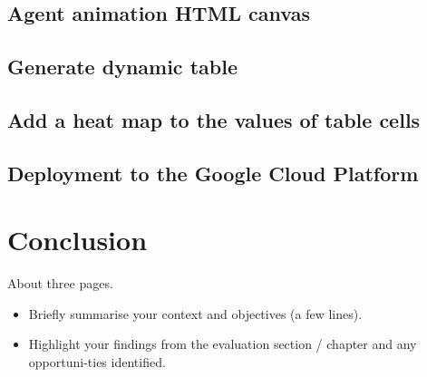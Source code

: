 \section{Agent animation HTML canvas}

\section{Generate dynamic table}

\section{Add a heat map to the values of table cells}

\section{Deployment to the Google Cloud Platform}
	



\chapter{Conclusion}
About three pages.

\begin{itemize}
\item Briefly summarise your context and objectives (a few lines).
\item Highlight your findings from the evaluation section / chapter and any opportuni-ties identified.
\end{itemize}


